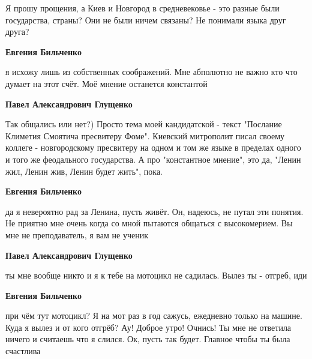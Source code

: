 \begin{itemize}
\begin{itemize}

Я прошу прощения, а Киев и Новгород в средневековье - это разные были
государства, страны? Они не были ничем связаны? Не понимали языка друг друга?


\textbf{Евгения Бильченко} 

я исхожу лишь из собственных соображений. Мне
абполютно не важно кто что думает на этот счёт. Моё мнение останется константой



\textbf{Павел Александрович Глущенко} 

Так общались или нет?) Просто тема моей кандидатской - текст "Послание Климетия
Смоятича пресвитеру Фоме". Киевский митрополит писал своему коллеге -
новгородскому пресвитеру на одном и том же языке в пределах одного и того же
феодального государства. А про "константное мнение", это да, "Ленин жил, Ленин
жив, Ленин будет жить", пока.



\textbf{Евгения Бильченко} 

да я невероятно рад за Ленина, пусть живёт. Он, надеюсь, не путал эти понятия.
Не приятно мне очень когда со мной пытаются общаться с высокомерием. Вы мне не
преподаватель, я вам не ученик



\textbf{Павел Александрович Глущенко} 

ты мне вообще никто и я к тебе на мотоцикл не садилась. Вылез ты - отгреб, иди


\textbf{Евгения Бильченко} 

при чём тут мотоцикл? Я на мот раз в год сажусь, ежедневно только на машине.
Куда я вылез и от кого отгрёб? Ау! Доброе утро! Очнись! Ты мне не ответила
ничего и считаешь что я слился. Ок, пусть так будет. Главное чтобы ты была
счастлива
\end{itemize}


\end{itemize}
